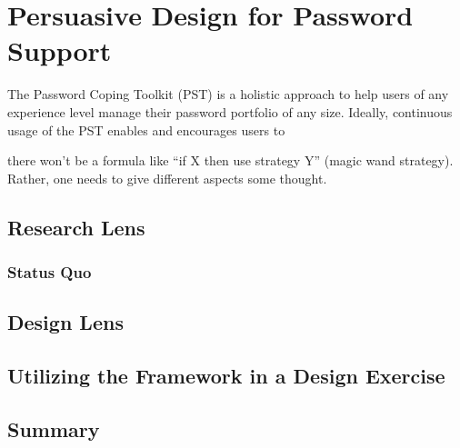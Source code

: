 
\chapter[Persuasive Design for Password Support]{Persuasive Design for Password Support}\label{chap:perdespassup}



The Password Coping Toolkit (PST) is a holistic approach to help users of any experience level manage their password portfolio of any size. Ideally, continuous usage of the PST enables and encourages users to 

there won't be a formula like ``if X then use strategy Y'' (magic wand strategy). Rather, one needs to give different aspects some thought. 


\section{Research Lens}




\subsection{Status Quo}

\section{Design Lens}



\section{Utilizing the Framework in a Design Exercise}


\section{Summary}